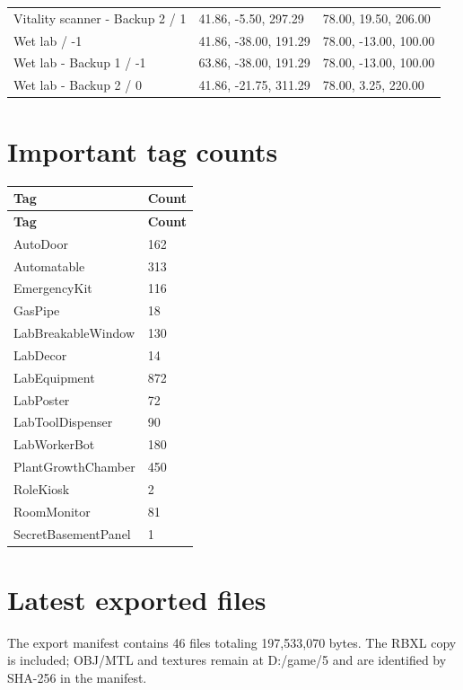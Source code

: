 \begin{longtable}{p{}p{}p{}}
Vitality scanner - Backup 2 /\allowbreak{} 1 & 41.\allowbreak{}86, -5.\allowbreak{}50, 297.\allowbreak{}29 & 78.\allowbreak{}00, 19.\allowbreak{}50, 206.\allowbreak{}00 \\
Wet lab /\allowbreak{} -1 & 41.\allowbreak{}86, -38.\allowbreak{}00, 191.\allowbreak{}29 & 78.\allowbreak{}00, -13.\allowbreak{}00, 100.\allowbreak{}00 \\
Wet lab - Backup 1 /\allowbreak{} -1 & 63.\allowbreak{}86, -38.\allowbreak{}00, 191.\allowbreak{}29 & 78.\allowbreak{}00, -13.\allowbreak{}00, 100.\allowbreak{}00 \\
Wet lab - Backup 2 /\allowbreak{} 0 & 41.\allowbreak{}86, -21.\allowbreak{}75, 311.\allowbreak{}29 & 78.\allowbreak{}00, 3.\allowbreak{}25, 220.\allowbreak{}00 \\
\bottomrule
\end{longtable}
\section{Important tag counts}
\begin{longtable}{p{}p{}}
\toprule
\textbf{Tag} & \textbf{Count} \\ \midrule
\endfirsthead
\textbf{Tag} & \textbf{Count} \\ \midrule
\endhead
AutoDoor & 162 \\
Automatable & 313 \\
EmergencyKit & 116 \\
GasPipe & 18 \\
LabBreakableWindow & 130 \\
LabDecor & 14 \\
LabEquipment & 872 \\
LabPoster & 72 \\
LabToolDispenser & 90 \\
LabWorkerBot & 180 \\
PlantGrowthChamber & 450 \\
RoleKiosk & 2 \\
RoomMonitor & 81 \\
SecretBasementPanel & 1 \\
\bottomrule
\end{longtable}
\section{Latest exported files}
The export manifest contains 46 files totaling 197,533,070 bytes.\allowbreak{} The RBXL copy is included; OBJ/\allowbreak{}MTL and textures remain at D:/\allowbreak{}game/\allowbreak{}5 and are identified by SHA-256 in the manifest.\allowbreak{}

